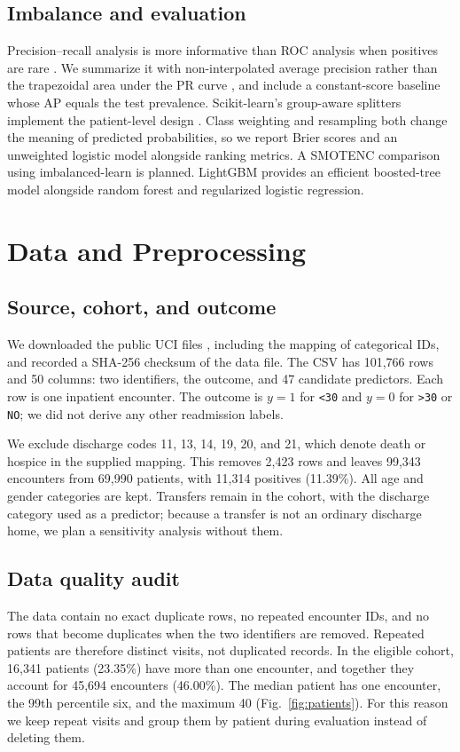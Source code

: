 \documentclass[conference]{IEEEtran}
\begin{document}
\subsection{Imbalance and evaluation}
Precision--recall analysis is more informative than ROC analysis when positives are rare \cite{saito}. We summarize it with non-interpolated average precision rather than the trapezoidal area under the PR curve \cite{apdoc}, and include a constant-score baseline whose AP equals the test prevalence. Scikit-learn's group-aware splitters implement the patient-level design \cite{groupdoc}. Class weighting and resampling both change the meaning of predicted probabilities, so we report Brier scores and an unweighted logistic model alongside ranking metrics. A SMOTENC comparison using imbalanced-learn \cite{imblearn} is planned. LightGBM \cite{lgbm} provides an efficient boosted-tree model alongside random forest and regularized logistic regression.

\section{Data and Preprocessing}
\subsection{Source, cohort, and outcome}
We downloaded the public UCI files \cite{uci}, including the mapping of categorical IDs, and recorded a SHA-256 checksum of the data file. The CSV has 101,766 rows and 50 columns: two identifiers, the outcome, and 47 candidate predictors. Each row is one inpatient encounter. The outcome is $y=1$ for \texttt{<30} and $y=0$ for \texttt{>30} or \texttt{NO}; we did not derive any other readmission labels.

We exclude discharge codes 11, 13, 14, 19, 20, and 21, which denote death or hospice in the supplied mapping. This removes 2,423 rows and leaves 99,343 encounters from 69,990 patients, with 11,314 positives (11.39\%). All age and gender categories are kept. Transfers remain in the cohort, with the discharge category used as a predictor; because a transfer is not an ordinary discharge home, we plan a sensitivity analysis without them.

\subsection{Data quality audit}
The data contain no exact duplicate rows, no repeated encounter IDs, and no rows that become duplicates when the two identifiers are removed. Repeated patients are therefore distinct visits, not duplicated records. In the eligible cohort, 16,341 patients (23.35\%) have more than one encounter, and together they account for 45,694 encounters (46.00\%). The median patient has one encounter, the 99th percentile six, and the maximum 40 (Fig.~\ref{fig:patients}). For this reason we keep repeat visits and group them by patient during evaluation instead of deleting them.
\end{document}
